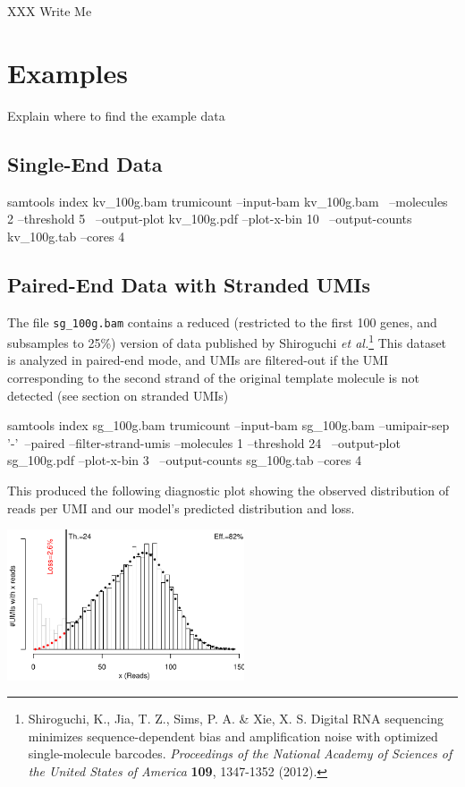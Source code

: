 \documentclass[10pt]{article}
\begin{document}
XXX Write Me

\section{Examples}

Explain where to find the example data

\subsection*{Single-End Data}

\begin{shellcode}
samtools index kv_100g.bam
trumicount --input-bam kv_100g.bam \
  --molecules 2 --threshold 5 \
  --output-plot kv_100g.pdf --plot-x-bin 10 \
  --output-counts kv_100g.tab
  --cores 4
\end{shellcode}

\subsection{Paired-End Data with Stranded UMIs}

The file \texttt{sg\_100g.bam} contains a reduced (restricted to the first 100 genes, and subsamples to 25\%) version of data published by Shiroguchi \textit{et al.}\footnote{Shiroguchi, K., Jia, T. Z., Sims, P. A. \& Xie, X. S. Digital RNA sequencing
minimizes sequence-dependent bias and amplification noise with optimized
single-molecule barcodes. \textit{Proceedings of the National Academy of Sciences of
the United States of America} \textbf{109}, 1347-1352 (2012).} This dataset is analyzed in paired-end mode, and UMIs are filtered-out if the UMI corresponding to the second strand of the original template molecule is not detected (see section on stranded UMIs)

\begin{shellcode}
samtools index sg_100g.bam
trumicount --input-bam sg_100g.bam --umipair-sep '-'\
  --paired --filter-strand-umis --molecules 1 --threshold 24 \
  --output-plot sg_100g.pdf --plot-x-bin 3 \
  --output-counts sg_100g.tab
  --cores 4
\end{shellcode}

This produced the following diagnostic plot showing the observed distribution of reads per UMI and our model's predicted distribution and loss.

{\centering \includegraphics[width=7cm]{examples/sg_100g.pdf}\\}
\end{document}
